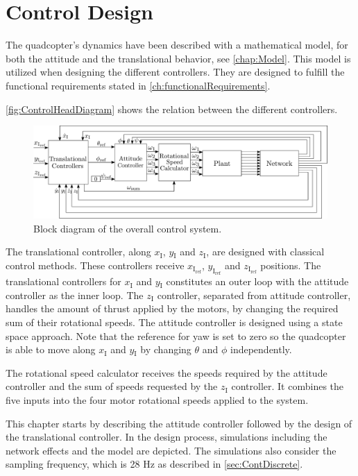 \chapter{Control Design}\label{chap:Control}
The quadcopter's dynamics have been described with a mathematical model, for both the attitude and the translational behavior, see \autoref{chap:Model}. This model is utilized when designing the different controllers. They are designed to fulfill the functional requirements stated in \autoref{ch:functionalRequirements}.

\autoref{fig:ControlHeadDiagram} shows the relation between the different controllers.

\begin{figure}[H]
	\centering
	\includegraphics[width=1 \textwidth]{figures/ControlDiagramPoster}
	\caption{Block diagram of the overall control system.}
	\label{fig:ControlHeadDiagram}
\end{figure}
%
The translational controller, along $x_{\mathrm{I}}$, $y\mathrm{_I}$ and $z\mathrm{_I}$, are designed with classical control methods. These controllers receive $x_\mathrm{I_{ref}}$, $y_\mathrm{I_{ref}}$ and $z_\mathrm{I_{ref}}$ positions. The translational controllers for $x\mathrm{_I}$ and $y\mathrm{_I}$ constitutes an outer loop with the attitude controller as the inner loop. The $z\mathrm{_I}$ controller, separated from attitude controller, handles the amount of thrust applied by the motors, by changing the required sum of their rotational speeds. The attitude controller is designed using a state space approach. Note that the reference for yaw is set to zero so the quadcopter is able to move along $x_{\mathrm{I}}$ and $y\mathrm{_I}$ by changing $\theta$ and $\phi$ independently.

The rotational speed calculator receives the speeds required by the attitude controller and the sum of speeds requested by the $z\mathrm{_I}$ controller. It combines the five inputs into the four motor rotational speeds applied to the system.


This chapter starts by describing the attitude controller followed by the design of the translational controller. In the design process, simulations including the network effects and the model are depicted. The simulations also consider the sampling frequency, which is 28 Hz as described in \autoref{sec:ContDiscrete}.